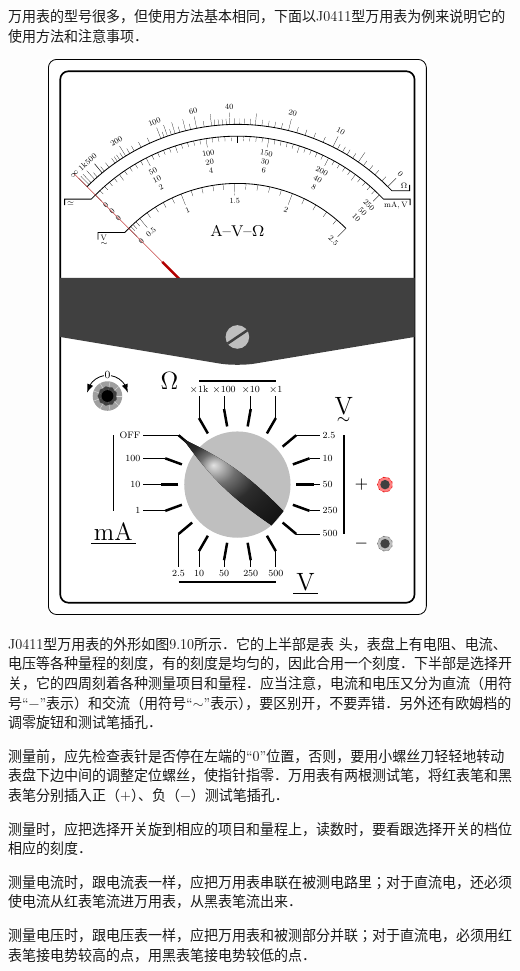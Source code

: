 万用表的型号很多，但使用方法基本相同，下面以J0411型万用表为例来说明它的使用方法和注意事项．
\begin{figure}[htbp]
    \centering
    \includegraphics{fig/B/9-10.pdf}
    \caption{}\label{fig_B_9-10}
\end{figure}

J0411型万用表的外形如图9.10所示．它的上半部是表
头，表盘上有电阻、电流、电压等各种量程的刻度，有的刻度是均匀的，因此合用一个刻度．下半部是选择开关，它的四周刻着各种测量项目和量程．应当注意，电流和电压又分为直流（用符号“$-$”表示）和交流（用符号“$\sim$”表示），要区别开，不要弄错．另外还有欧姆档的调零旋钮和测试笔插孔．

测量前，应先检查表针是否停在左端的“0”位置，否则，要用小螺丝刀轻轻地转动表盘下边中间的调整定位螺丝，使指针指零．万用表有两根测试笔，将红表笔和黑表笔分别插入正（$+$）、负（$-$）测试笔插孔．

测量时，应把选择开关旋到相应的项目和量程上，读数时，要看跟选择开关的档位相应的刻度．

测量电流时，跟电流表一样，应把万用表串联在被测电路里；对于直流电，还必须使电流从红表笔流进万用表，从黑表笔流出来．

测量电压时，跟电压表一样，应把万用表和被测部分并联；对于直流电，必须用红表笔接电势较高的点，用黑表笔接电势较低的点．

